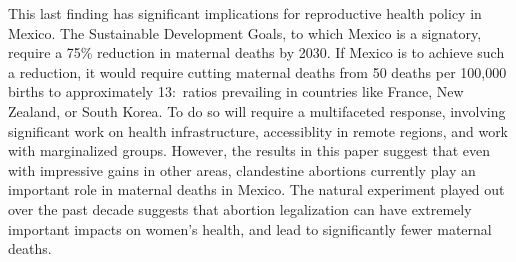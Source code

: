 \documentclass[a4paper, 11pt]{article}
\begin{document}
\begin{spacing}{2}
This last finding has significant implications for reproductive health policy in Mexico.  The Sustainable Development Goals, to which Mexico is a signatory, require a 75\% reduction in maternal deaths by 2030.  If Mexico is to achieve such a reduction, it would require cutting maternal deaths from 50 deaths per 100,000 births to approximately 13:\ ratios prevailing in countries like France, New Zealand, or South Korea.  To do so will require a multifaceted response, involving significant work on health infrastructure, accessiblity in remote regions, and work with marginalized groups.  However, the results in this paper suggest that even with impressive gains in other areas, clandestine abortions currently play an important role in maternal deaths in Mexico.  The natural experiment played out over the past decade suggests that abortion legalization can have extremely important impacts on women's health, and lead to significantly fewer maternal deaths.
\end{spacing}
\newpage


\end{document}
